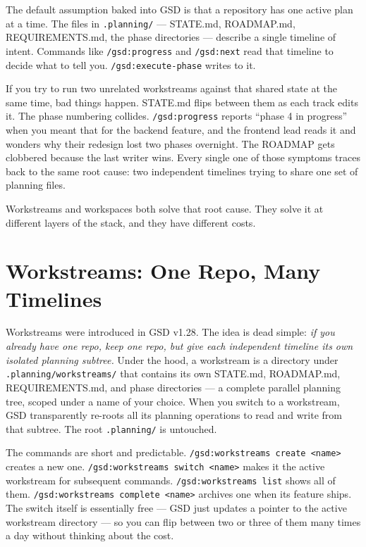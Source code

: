 \documentclass[11pt,letterpaper,openany]{book}
\begin{document}
The default assumption baked into GSD is that a repository has one
active plan at a time. The files in \texttt{.planning/} --- STATE.md,
ROADMAP.md, REQUIREMENTS.md, the phase directories --- describe a
single timeline of intent. Commands like \texttt{/gsd:progress} and
\texttt{/gsd:next} read that timeline to decide what to tell you.
\texttt{/gsd:execute-phase} writes to it.

If you try to run two unrelated workstreams against that shared state
at the same time, bad things happen. STATE.md flips between them as
each track edits it. The phase numbering collides. \texttt{/gsd:progress}
reports ``phase 4 in progress'' when you meant that for the backend
feature, and the frontend lead reads it and wonders why their redesign
lost two phases overnight. The ROADMAP gets clobbered because the
last writer wins. Every single one of those symptoms traces back to
the same root cause: two independent timelines trying to share one
set of planning files.

Workstreams and workspaces both solve that root cause. They solve it
at different layers of the stack, and they have different costs.

\section{Workstreams: One Repo, Many Timelines}

Workstreams were introduced in GSD v1.28. The idea is dead simple:
\emph{if you already have one repo, keep one repo, but give each
independent timeline its own isolated planning subtree.} Under the
hood, a workstream is a directory under \texttt{.planning/workstreams/}
that contains its own STATE.md, ROADMAP.md, REQUIREMENTS.md, and
phase directories --- a complete parallel planning tree, scoped
under a name of your choice. When you switch to a workstream, GSD
transparently re-roots all its planning operations to read and write
from that subtree. The root \texttt{.planning/} is untouched.

The commands are short and predictable. \texttt{/gsd:workstreams create
<name>} creates a new one. \texttt{/gsd:workstreams switch <name>}
makes it the active workstream for subsequent commands. \texttt{/gsd:workstreams
list} shows all of them. \texttt{/gsd:workstreams complete <name>} archives
one when its feature ships. The switch itself is essentially free ---
GSD just updates a pointer to the active workstream directory --- so
you can flip between two or three of them many times a day without
thinking about the cost.
\end{document}
